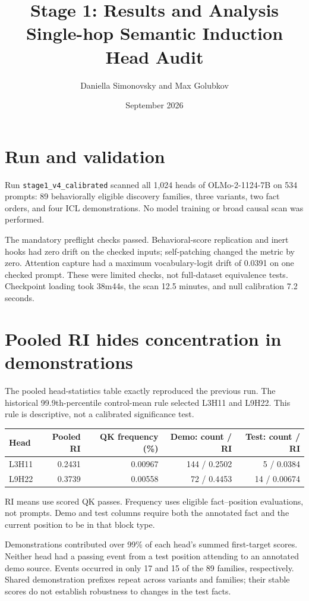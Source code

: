 \documentclass[11pt,a4paper]{article}
\title{Stage 1: Results and Analysis\\\large Single-hop Semantic Induction Head Audit}
\author{Daniella Simonovsky and Max Golubkov}
\date{September 2026}
\begin{document}
\maketitle

\section{Run and validation}
Run \texttt{stage1\_v4\_calibrated} scanned all 1,024 heads of OLMo-2-1124-7B on 534 prompts: 89 behaviorally eligible discovery families, three variants, two fact orders, and four ICL demonstrations. No model training or broad causal scan was performed.

The mandatory preflight checks passed. Behavioral-score replication and inert hooks had zero drift on the checked inputs; self-patching changed the metric by zero. Attention capture had a maximum vocabulary-logit drift of 0.0391 on one checked prompt. These were limited checks, not full-dataset equivalence tests. Checkpoint loading took 38m44s, the scan 12.5 minutes, and null calibration 7.2 seconds.

\section{Pooled RI hides concentration in demonstrations}
The pooled head-statistics table exactly reproduced the previous run. The historical 99.9th-percentile control-mean rule selected L3H11 and L9H22. This rule is descriptive, not a calibrated significance test.

\begin{center}
\small
\begin{tabular}{lrrrr}
\toprule
Head & Pooled RI & QK frequency (\%) & Demo: count / RI & Test: count / RI \\
\midrule
L3H11 & 0.2431 & 0.00967 & 144 / 0.2502 & 5 / 0.0384 \\
L9H22 & 0.3739 & 0.00558 & 72 / 0.4453 & 14 / 0.00674 \\
\bottomrule
\end{tabular}
\end{center}
RI means use scored QK passes. Frequency uses eligible fact--position evaluations, not prompts. Demo and test columns require both the annotated fact and the current position to be in that block type.

Demonstrations contributed over 99\% of each head's summed first-target scores. Neither head had a passing event from a test position attending to an annotated demo source. Events occurred in only 17 and 15 of the 89 families, respectively. Shared demonstration prefixes repeat across variants and families; their stable scores do not establish robustness to changes in the test facts.
\end{document}
